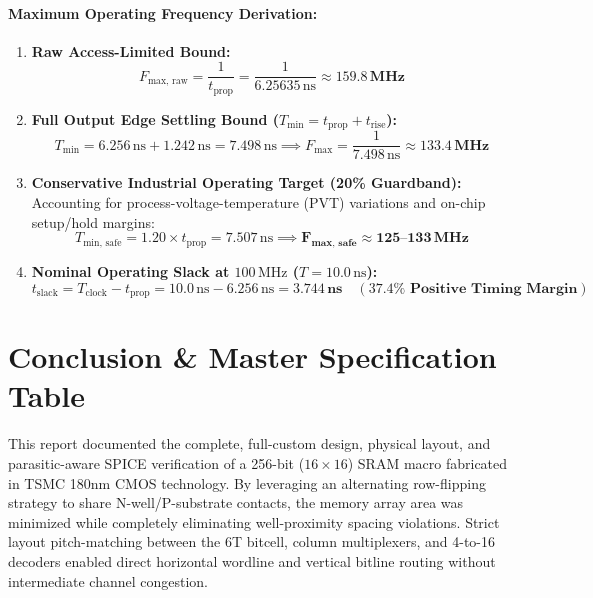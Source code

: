 \documentclass[10pt,a4paper,titlepage]{article}
\begin{document}
\paragraph{Maximum Operating Frequency Derivation:}
\begin{enumerate}[itemsep=2pt]
    \item \textbf{Raw Access-Limited Bound:}
      \begin{equation}
          F_{\text{max, raw}} = \frac{1}{t_{\text{prop}}} = \frac{1}{6.25635\,\text{ns}} \approx \mathbf{159.8\,\text{MHz}}
      \end{equation}
    \item \textbf{Full Output Edge Settling Bound ($T_{\text{min}} = t_{\text{prop}} + t_{\text{rise}}$):}
      \begin{equation}
          T_{\text{min}} = 6.256\,\text{ns} + 1.242\,\text{ns} = 7.498\,\text{ns} \implies F_{\text{max}} = \frac{1}{7.498\,\text{ns}} \approx \mathbf{133.4\,\text{MHz}}
      \end{equation}
    \item \textbf{Conservative Industrial Operating Target (20\% Guardband):}
      Accounting for process-voltage-temperature (PVT) variations and on-chip setup/hold margins:
      \begin{equation}
          T_{\text{min, safe}} = 1.20 \times t_{\text{prop}} = 7.507\,\text{ns} \implies \mathbf{F_{\text{max, safe}} \approx 125\text{--}133\,\text{MHz}}
      \end{equation}
    \item \textbf{Nominal Operating Slack at $100\,\text{MHz}$ ($T = 10.0\,\text{ns}$):}
      \begin{equation}
          t_{\text{slack}} = T_{\text{clock}} - t_{\text{prop}} = 10.0\,\text{ns} - 6.256\,\text{ns} = \mathbf{3.744\,\text{ns}} \quad \mathbf{(37.4\%\text{ Positive Timing Margin})}
      \end{equation}
\end{enumerate}

\newpage
\section{Conclusion \& Master Specification Table}

This report documented the complete, full-custom design, physical layout, and parasitic-aware SPICE verification of a 256-bit ($16 \times 16$) SRAM macro fabricated in TSMC 180nm CMOS technology. By leveraging an alternating row-flipping strategy to share N-well/P-substrate contacts, the memory array area was minimized while completely eliminating well-proximity spacing violations. Strict layout pitch-matching between the 6T bitcell, column multiplexers, and 4-to-16 decoders enabled direct horizontal wordline and vertical bitline routing without intermediate channel congestion. 
\end{document}
